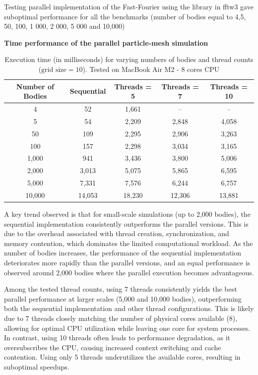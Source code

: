 \documentclass{article}
\begin{document}
Testing parallel implementation  of the Fast-Fourier using the library in fftw3 gave suboptimal performance for all the benchmarks (number of bodies equal to 4,5, 50, 100, 1 000, 2 000, 5 000 and 10,000)

\textbf{Time performance of the parallel particle-mesh simulation}
\begin{table}[htbp]
\centering
\begin{tabular}{|c|c|c|c|c|}
\hline
\textbf{Number of Bodies} & \textbf{Sequential} & \textbf{Threads = 5} & \textbf{Threads = 7} & \textbf{Threads = 10} \\
\hline
4      & 52    & 1,661  & --    & --     \\
5      & 54    & 2,209  & 2,848  & 4,058   \\
50     & 109   & 2,295  & 2,906  & 3,263   \\
100    & 157   & 2,298  & 3,034  & 3,165   \\
1,000  & 941   & 3,436  & 3,800  & 5,006   \\
2,000  & 3,013  & 5,075  & 5,865  & 6,595   \\
5,000  & 7,331  & 7,576  & 6,244  & 6,757   \\
10,000 & 14,053  & 18,230 & 12,306 & 13,881  \\
\hline
\end{tabular}
\caption{Execution time (in milliseconds) for varying numbers of bodies and thread counts ($\text{grid size} = 10$). Tested on MacBook Air M2 - 8 cores CPU}
\label{tab:thread_performance}
\end{table}

A key trend observed is that for small-scale simulations (up to 2,000 bodies), the sequential implementation consistently outperforms the parallel versions. This is due to the overhead associated with thread creation, synchronization, and memory contention, which dominates the limited computational workload. As the number of bodies increases, the performance of the sequential implementation deteriorates more rapidly than the parallel versions, and an equal performance is observed around 2,000 bodies where the parallel execution becomes advantageous.

Among the tested thread counts, using 7 threads consistently yields the best parallel performance at larger scales (5,000 and 10,000 bodies), outperforming both the sequential implementation and other thread configurations. This is likely due to 7 threads closely matching the number of physical cores available (8), allowing for optimal CPU utilization while leaving one core for system processes. In contrast, using 10 threads often leads to performance degradation, as it oversubscribes the CPU, causing increased context switching and cache contention. Using only 5 threads underutilizes the available cores, resulting in suboptimal speedups.
\end{document}
